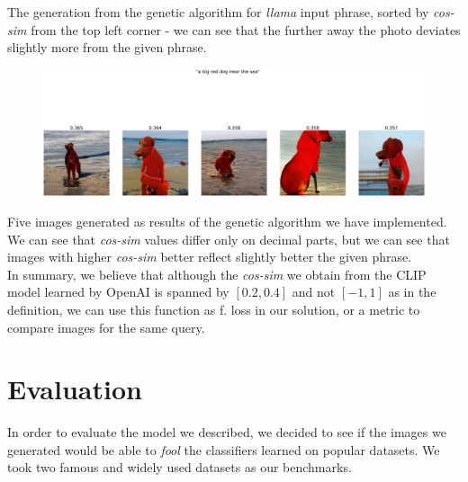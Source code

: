\documentclass[12pt,a4paper,openany]{book}
\begin{document}
\noindent The generation from the genetic algorithm for \textit{llama} input phrase,  sorted by \textit{cos-sim} from the top left corner - we can see that the further away the photo deviates slightly more from the given phrase. \\
\begin{figure}[H]
    \centering
    \includegraphics[scale=0.08]{figs/bigreddog.png}
\end{figure}
\noindent Five images generated as results of the genetic algorithm we have implemented. We can see that \textit{cos-sim} values differ only on decimal parts, but we can see that images with higher \textit{cos-sim} better reflect slightly better the given phrase.  \\

\noindent In summary, we believe that although the \textit{cos-sim} we obtain from the CLIP model learned by OpenAI is spanned by $[0.2, 0.4]$ and not $[-1, 1]$ as in the definition, we can use this function as f. loss in our solution, or a metric to compare images for the same query.

\chapter{Evaluation}


\noindent In order to evaluate the model we described, we decided to see if the images we generated would be able to \textit{fool} the classifiers learned on popular datasets.
We took two famous and widely used datasets as our benchmarks.
\end{document}
